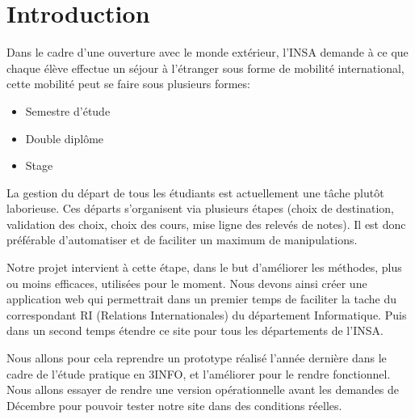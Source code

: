 \chapter*{Introduction}
Dans le cadre d'une ouverture avec le monde extérieur, l'INSA demande à ce que chaque élève effectue un séjour à l’étranger sous forme de mobilité international, cette mobilité peut se faire sous plusieurs formes:
\begin{itemize}
\item Semestre d'étude
\item Double diplôme
\item Stage
\end{itemize}

La gestion du départ de tous les étudiants est actuellement une tâche plutôt laborieuse.
Ces départs s'organisent via plusieurs étapes (choix de destination, validation des choix, choix des cours, mise ligne des relevés de notes). Il est donc préférable d'automatiser et de faciliter un maximum de manipulations.

Notre projet intervient à cette étape, dans le but d'améliorer les méthodes, plus ou moins efficaces, utilisées pour le moment. Nous devons ainsi créer une application web qui permettrait dans un premier temps de faciliter la tache du correspondant RI (Relations Internationales) du département Informatique. Puis dans un second temps étendre ce site pour tous les départements de l'INSA.

Nous allons pour cela reprendre un prototype réalisé l'année dernière dans le cadre de l'étude pratique en 3INFO, et l'améliorer pour le rendre fonctionnel.
Nous allons essayer de rendre une version opérationnelle avant les demandes de Décembre pour pouvoir tester notre site dans des conditions réelles.
